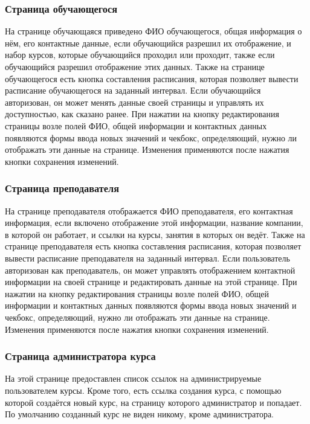 \documentclass[11pt]{article}
\begin{document}
\subsubsection{Страница обучающегося}
\label{sec:org302ff02}
На странице обучающаяся приведено ФИО обучающегося, общая информация о нём, его контактные данные,
если обучающийся разрешил их отображение, и набор курсов, которые обучающийся проходил или
проходит, также если обучающийся разрешил отображение этих данных. Также на странице обучающегося
есть кнопка составления расписания, которая позволяет вывести расписание обучающегося на заданный
интервал. Если обучающийся авторизован, он может менять данные своей страницы и управлять их
доступностью, как сказано ранее. При нажатии на кнопку редактирования страницы возле полей ФИО,
общей информации и контактных данных появляются формы ввода новых значений и чекбокс,
определяющий, нужно ли отображать эти данные на странице. Изменения применяются после нажатия
кнопки сохранения изменений.
\subsubsection{Страница преподавателя}
\label{sec:orgc2afee3}
На странице преподавателя отображается ФИО преподавателя, его контактная информация, если
включено отображение этой информации, название компании, в которой он работает,
и ссылки на курсы, занятия в которых он ведёт. Также на странице преподавателя есть кнопка
составления расписания, которая позволяет вывести расписание преподавателя на заданный интервал.
Если пользователь авторизован как преподаватель, он может управлять отображением контактной
информации на своей странице и редактировать данные на этой странице. При нажатии на кнопку редактирования страницы возле полей ФИО,
общей информации и контактных данных появляются формы ввода новых значений и чекбокс,
определяющий, нужно ли отображать эти данные на странице. Изменения применяются после нажатия
кнопки сохранения изменений.
\subsubsection{Страница администратора курса}
\label{sec:org22e4fc7}
На этой странице предоставлен список ссылок на администрируемые пользователем курсы. Кроме
того, есть ссылка создания курса, с помощью которой создаётся новый курс, на страницу которого
администратор и попадает. По умолчанию созданный курс не виден никому, кроме администратора.
\end{document}
